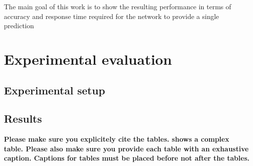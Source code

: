 The main goal of this work is to show the resulting performance in terms of accuracy and response time required for the network to provide a single prediction


\section{Experimental evaluation}

\subsection{Experimental setup}

\subsection{Results}
\textbf{Please make sure you explicitely cite the tables.
 shows a complex table.
Please also make sure you provide each table with an exhaustive caption.
Captions for tables must be placed before not after the tables.}



